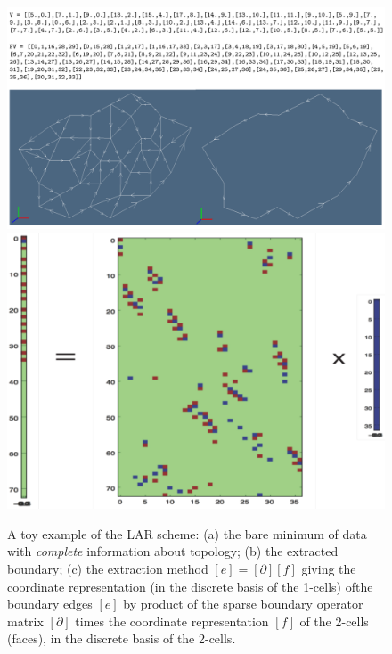 \begin{figure}[htbp] %
 \centering
 \includegraphics[width=0.5\linewidth]{images/minimum} 
 \hfill
 \includegraphics[width=0.4\linewidth]{images/boundary} 
 \caption{A toy example of the LAR scheme: (a) the bare minimum of data with \emph{complete} information about topology; (b) the extracted boundary; (c) the extraction method $[e] = [\partial][f]$ giving the coordinate representation (in the discrete basis of the 1-cells) ofthe boundary edges $[e]$ by product of the sparse boundary operator matrix $[\partial]$ times the coordinate representation $[f]$ of the 2-cells (faces), in the discrete basis of the 2-cells.}
 \label{fig:minimum}
\end{figure}


 
